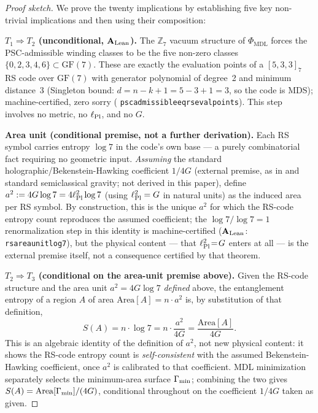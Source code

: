 \documentclass[11pt]{article}
\theoremstyle{remark}
\newcommand{\PHIMDL}{\Phi_{\mathrm{MDL}}}
\newcommand{\ZS}{\mathbb{Z}_7}
\newcommand{\lean}[1]{%
  \penalty-100
  \begingroup\def\_{\textunderscore\allowbreak}\texttt{#1}\endgroup}
\newcommand{\lPl}{\ell_{\rm Pl}}
\newcommand{\CatAL}{\ensuremath{\textbf{A}_{\rm Lean}}}
\begin{document}
\begin{proof}[Proof sketch]
We prove the twenty implications by establishing five key non-trivial implications and
then using their composition:

\smallskip\noindent\textbf{$T_1\Rightarrow T_2$ (unconditional, $\CatAL$).}  The $\ZS$
vacuum structure of $\PHIMDL$ forces the PSC-admissible winding classes to be the five
non-zero classes $\{0,2,3,4,6\}\subset\mathrm{GF}(7)$.  These are exactly the
evaluation points of a $[5,3,3]_7$ RS code over $\mathrm{GF}(7)$ with generator
polynomial of degree~2 and minimum distance~3 (Singleton bound:
$d = n-k+1 = 5-3+1=3$, so the code is MDS); machine-certified, zero sorry
(\lean{psc\_admissible\_eq\_rs\_eval\_points}).  This step involves no metric, no
$\lPl$, and no $G$.

\smallskip\noindent\textbf{Area unit (conditional premise, not a further
derivation).}  Each RS symbol carries entropy $\log 7$ in the code's own base --- a
purely combinatorial fact requiring no geometric input.  \emph{Assuming} the standard
holographic/Bekenstein-Hawking coefficient $1/4G$ (external premise, as in
\cite{Ryu2006} and standard semiclassical gravity; not derived in this paper), define
$a^2 := 4G\log 7 = 4\lPl^2\log 7$ (using $\lPl^2 = G$ in natural units) as the induced
area per RS symbol.  By construction, this is the unique $a^2$ for which the RS-code
entropy count reproduces the assumed coefficient; the $\log 7/\log 7=1$
renormalization step in this identity is machine-certified ($\CatAL$:
\lean{rs\_area\_unit\_log7}), but the physical content --- that $\lPl^2\!=\!G$ enters at
all --- is the external premise itself, not a consequence certified by that theorem.

\smallskip\noindent\textbf{$T_2\Rightarrow T_3$ (conditional on the area-unit
premise above).}  Given the RS-code structure and the area unit $a^2 = 4G\log 7$
\emph{defined} above, the entanglement entropy of a region $A$ of area
$\mathrm{Area}[A] = n\cdot a^2$ is, by substitution of that definition,
\begin{equation}
  S(A) = n\cdot\log 7 = n\cdot\frac{a^2}{4G} = \frac{\mathrm{Area}[A]}{4G}.
\end{equation}
This is an algebraic identity of the definition of $a^2$, not new physical content: it
shows the RS-code entropy count is \emph{self-consistent} with the assumed
Bekenstein-Hawking coefficient, once $a^2$ is calibrated to that coefficient.  MDL
minimization separately selects the minimum-area surface $\Gamma_{\rm min}$; combining
the two gives $S(A) = \mathrm{Area}[\Gamma_{\rm min}]/(4G)$, conditional throughout on
the coefficient $1/4G$ taken as given.


\end{proof}
\end{document}
